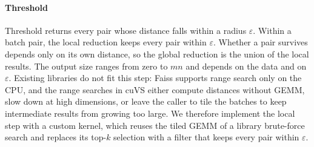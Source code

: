 \paragraph{Threshold}
Threshold returns every pair whose distance falls within a radius $\varepsilon$.
Within a batch pair, the local reduction keeps every pair within $\varepsilon$.
Whether a pair survives depends only on its own distance, so the global reduction is the union of the local results.
The output size ranges from zero to $mn$ and depends on the data and on $\varepsilon$.
Existing libraries do not fit this step: Faiss supports range search only on the CPU, and the range searches in cuVS either compute distances without GEMM, slow down at high dimensions, or leave the caller to tile the batches to keep intermediate results from growing too large.
We therefore implement the local step with a custom kernel, which reuses the tiled GEMM of a library brute-force search and replaces its top-$k$ selection with a filter that keeps every pair within $\varepsilon$.
